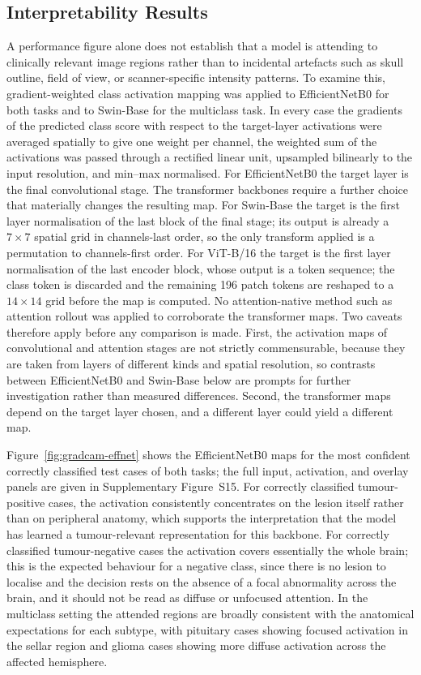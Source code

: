 \documentclass[final,3p,times,number]{elsarticle}
\begin{document}
\subsection{Interpretability Results}
\label{sec:interpretability}

A performance figure alone does not establish that a model is attending to clinically relevant image regions rather than to incidental artefacts such as skull outline, field of view, or scanner-specific intensity patterns. To examine this, gradient-weighted class activation mapping was applied to EfficientNetB0 for both tasks and to Swin-Base for the multiclass task. In every case the gradients of the predicted class score with respect to the target-layer activations were averaged spatially to give one weight per channel, the weighted sum of the activations was passed through a rectified linear unit, upsampled bilinearly to the input resolution, and min--max normalised. For EfficientNetB0 the target layer is the final convolutional stage. The transformer backbones require a further choice that materially changes the resulting map. For Swin-Base the target is the first layer normalisation of the last block of the final stage; its output is already a $7\times 7$ spatial grid in channels-last order, so the only transform applied is a permutation to channels-first order. For ViT-B/16 the target is the first layer normalisation of the last encoder block, whose output is a token sequence; the class token is discarded and the remaining 196 patch tokens are reshaped to a $14\times 14$ grid before the map is computed. No attention-native method such as attention rollout was applied to corroborate the transformer maps. Two caveats therefore apply before any comparison is made. First, the activation maps of convolutional and attention stages are not strictly commensurable, because they are taken from layers of different kinds and spatial resolution, so contrasts between EfficientNetB0 and Swin-Base below are prompts for further investigation rather than measured differences. Second, the transformer maps depend on the target layer chosen, and a different layer could yield a different map.

Figure~\ref{fig:gradcam-effnet} shows the EfficientNetB0 maps for the most confident correctly classified test cases of both tasks; the full input, activation, and overlay panels are given in Supplementary Figure~S15. For correctly classified tumour-positive cases, the activation consistently concentrates on the lesion itself rather than on peripheral anatomy, which supports the interpretation that the model has learned a tumour-relevant representation for this backbone. For correctly classified tumour-negative cases the activation covers essentially the whole brain; this is the expected behaviour for a negative class, since there is no lesion to localise and the decision rests on the absence of a focal abnormality across the brain, and it should not be read as diffuse or unfocused attention. In the multiclass setting the attended regions are broadly consistent with the anatomical expectations for each subtype, with pituitary cases showing focused activation in the sellar region and glioma cases showing more diffuse activation across the affected hemisphere.
\end{document}
